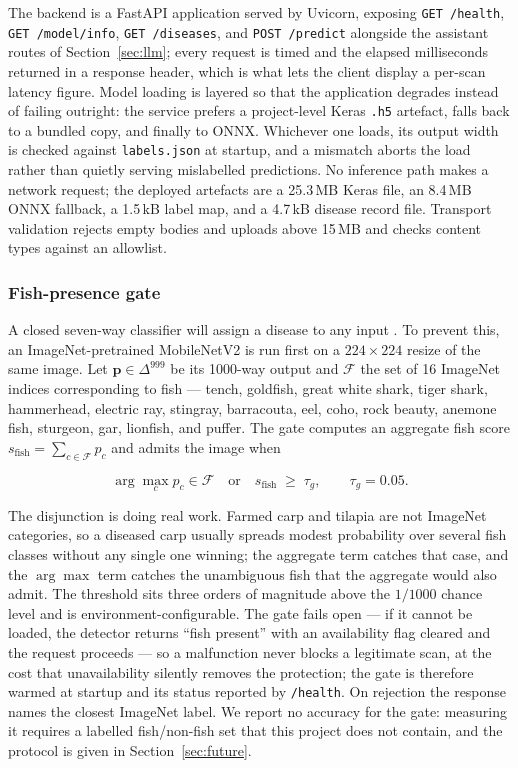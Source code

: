 \documentclass[conference]{IEEEtran}
\begin{document}
The backend is a FastAPI application \cite{b15} served by Uvicorn, exposing \texttt{GET /health}, \texttt{GET /model/info}, \texttt{GET /diseases}, and \texttt{POST /predict} alongside the assistant routes of Section~\ref{sec:llm}; every request is timed and the elapsed milliseconds returned in a response header, which is what lets the client display a per-scan latency figure. Model loading is layered so that the application degrades instead of failing outright: the service prefers a project-level Keras \texttt{.h5} artefact, falls back to a bundled copy, and finally to ONNX. Whichever one loads, its output width is checked against \texttt{labels.json} at startup, and a mismatch aborts the load rather than quietly serving mislabelled predictions. No inference path makes a network request; the deployed artefacts are a 25.3\,MB Keras file, an 8.4\,MB ONNX fallback, a 1.5\,kB label map, and a 4.7\,kB disease record file. Transport validation rejects empty bodies and uploads above 15\,MB and checks content types against an allowlist.

\subsubsection{Fish-presence gate}
\label{subsec:gate}

A closed seven-way classifier will assign a disease to any input \cite{b25}. To prevent this, an ImageNet-pretrained \cite{b26} MobileNetV2 \cite{b7} is run first on a $224\times224$ resize of the same image. Let $\mathbf{p}\in\Delta^{999}$ be its 1000-way output and $\mathcal{F}$ the set of 16 ImageNet indices corresponding to fish --- tench, goldfish, great white shark, tiger shark, hammerhead, electric ray, stingray, barracouta, eel, coho, rock beauty, anemone fish, sturgeon, gar, lionfish, and puffer. The gate computes an aggregate fish score $s_{\mathrm{fish}}=\sum_{c\in\mathcal{F}}p_c$ and admits the image when

\begin{equation}
\arg\max_{c} p_c \in \mathcal{F}
\quad\text{or}\quad
s_{\mathrm{fish}} \;\geq\; \tau_g ,
\qquad \tau_g = 0.05 .
\label{eq:gate}
\end{equation}

The disjunction is doing real work. Farmed carp and tilapia are not ImageNet categories, so a diseased carp usually spreads modest probability over several fish classes without any single one winning; the aggregate term catches that case, and the $\arg\max$ term catches the unambiguous fish that the aggregate would also admit. The threshold sits three orders of magnitude above the $1/1000$ chance level and is environment-configurable. The gate fails open --- if it cannot be loaded, the detector returns ``fish present'' with an availability flag cleared and the request proceeds --- so a malfunction never blocks a legitimate scan, at the cost that unavailability silently removes the protection; the gate is therefore warmed at startup and its status reported by \texttt{/health}. On rejection the response names the closest ImageNet label. We report no accuracy for the gate: measuring it requires a labelled fish/non-fish set that this project does not contain, and the protocol is given in Section~\ref{sec:future}.
\end{document}
